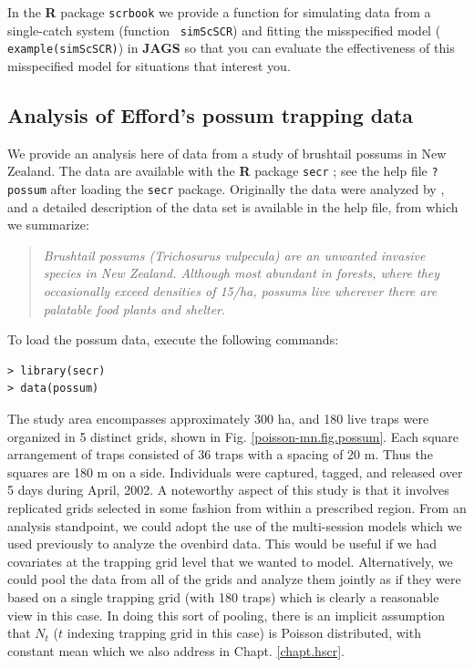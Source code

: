 In the {\bf R} package \mbox{\tt scrbook} we provide a function for
simulating data from a single-catch system (function \mbox{\tt
  simScSCR}) and fitting the misspecified model (\mbox{\tt
  example(simScSCR)}) in {\bf JAGS} so that you can
evaluate the effectiveness of this misspecified model for
situations that interest you.


\subsection{Analysis of Efford's possum trapping data}
\label{poisson-mn.sec.possum}

We provide an analysis here of data from a study of brushtail possums
in New Zealand. The data are available with the {\bf R} package
\mbox{\tt secr} \citep{efford_etal:2009euring}; see the help file
\mbox{\tt ?possum} after loading the \mbox{\tt secr} package.
Originally the data were analyzed by \citet{efford_etal:2005}, and a
detailed description of the data set is available in the help file,
from which we summarize:

\begin{quote}
{\it Brushtail possums (Trichosurus vulpecula) are an unwanted invasive
species in New Zealand. Although most abundant in forests, where they
occasionally exceed densities of 15/ha, possums live wherever there
are palatable food plants and shelter}.
\end{quote}

To load the possum data, execute the following commands:
\begin{verbatim}
> library(secr)
> data(possum)
\end{verbatim}
The study area encompasses approximately 300 ha, and 180 live traps
were organized in 5 distinct grids, shown in
Fig. \ref{poisson-mn.fig.possum}.  Each square arrangement of traps
consisted of 36 traps with a spacing of 20 m. Thus the squares are 180
m on a side.  Individuals were captured, tagged, and released over 5
days during April, 2002.  A noteworthy aspect of this study is that it
involves replicated grids selected in some fashion from within a
prescribed region.  From an analysis standpoint, we could adopt the
use of the multi-session models which we used previously to analyze
the ovenbird data. This would be useful if we had covariates at the
trapping grid level that we wanted to model.  Alternatively, we could
pool the data from all of the grids and analyze them jointly as if
they were based on a single trapping grid (with 180 traps) which is
clearly a reasonable view in this case.  In doing this sort of
pooling, there is an implicit assumption that $N_{t}$ ($t$ indexing
trapping grid in this case) is Poisson distributed, with constant mean
\citep{royle:2004abc, royle_etal:2012arXiv} which we also address in
Chapt. \ref{chapt.hscr}.



